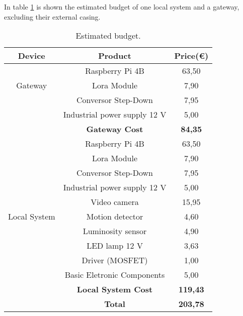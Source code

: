 In table \ref{table:data} is shown the estimated budget of one local system and a gateway, excluding their external casing.

\begin{table}[ht]
	\centering
	
	\begin{tabular}{||c | c | c||} 
		\hline
		\textbf{Device} & \textbf{Product} & \textbf{Price(€)}\\
		\hline\hline
		
		\multirow{3}{4em}{Gateway} & Raspberry Pi 4B & 63,50				\\
								   & Lora Module & 7,90 					\\
								   & Conversor Step-Down & 7,95				\\
								   & Industrial power supply 12 V & 5,00	\\
								   & \textbf{Gateway Cost} & \textbf{84,35}	\\
		\hline
		
		\multirow{11}{4em}{Local System} & Raspberry Pi 4B & 63,50					\\
								         & Lora Module & 7,90 						\\
								         & Conversor Step-Down & 7,95				\\
								         & Industrial power supply 12 V & 5,00		\\
								         & Video camera & 15,95						\\
								         & Motion detector & 4,60					\\
								         & Luminosity sensor & 4,90					\\
								         & LED lamp 12 V & 3,63						\\
								         & Driver (MOSFET) & 1,00					\\
								         & Basic Eletronic Components & 5,00		\\
								         & \textbf{Local System Cost} & \textbf{119,43}\\
		\hline\hline
		 & \textbf{Total} & \textbf{203,78}\\\hline
	\end{tabular}
	\caption{Estimated budget.}
	\label{table:data}
\end{table}